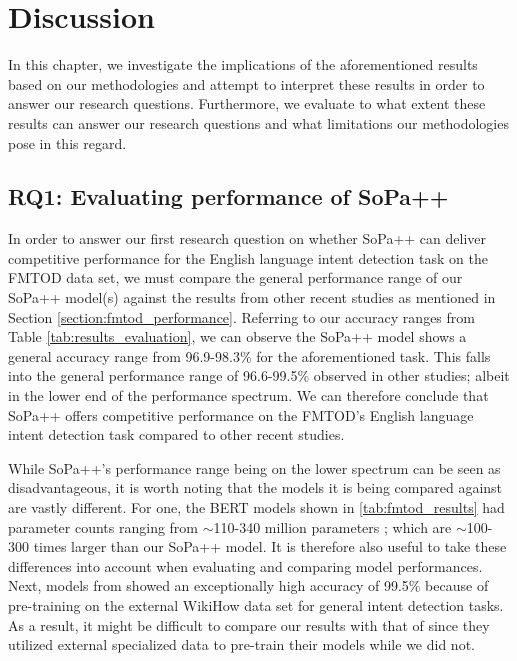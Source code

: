 \chapter{Discussion}

In this chapter, we investigate the implications of the aforementioned results
based on our methodologies and attempt to interpret these results in order to
answer our research questions. Furthermore, we evaluate to what extent these
results can answer our research questions and what limitations our methodologies
pose in this regard.

\section{RQ1: Evaluating performance of SoPa++}

In order to answer our first research question on whether SoPa++ can deliver
competitive performance for the English language intent detection task on the
FMTOD data set, we must compare the general performance range of our SoPa++
model(s) against the results from other recent studies as mentioned in Section
\ref{section:fmtod_performance}. Referring to our accuracy ranges from Table
\ref{tab:results_evaluation}, we can observe the SoPa++ model shows a general
accuracy range from 96.9-98.3$\%$ for the aforementioned task. This falls into
the general performance range of 96.6-99.5$\%$ observed in other studies; albeit
in the lower end of the performance spectrum. We can therefore conclude that
SoPa++ offers competitive performance on the FMTOD's English language intent
detection task compared to other recent studies.

While SoPa++'s performance range being on the lower spectrum can be seen as
disadvantageous, it is worth noting that the models it is being compared against
are vastly different. For one, the BERT models shown in
\ref{tab:fmtod_results} had parameter counts ranging from $\sim$110-340 million
parameters \citep{devlin-etal-2019-bert}; which are $\sim$100-300 times larger
than our SoPa++ model. It is therefore also useful to take these differences
into account when evaluating and comparing model performances. Next, models from
\citet{zhang-etal-2020-intent} showed an exceptionally high accuracy of
99.5$\%$ because of pre-training on the external WikiHow data set for general
intent detection tasks. As a result, it might be difficult to compare our
results with that of \citet{zhang-etal-2020-intent} since they utilized external
specialized data to pre-train their models while we did not.

